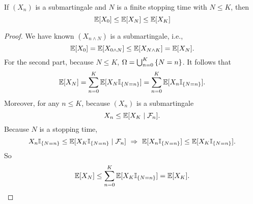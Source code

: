 \begin{lem}
    If $(X_n)$ is a submartingale and $N$ is a finite stopping time with $N \leq K$, then
    \begin{equation*}
        \mathbb{E}[X_0] \leq \mathbb{E}[X_N] \leq \mathbb{E}[X_K]
    \end{equation*}
\end{lem}
\begin{proof}
    We have known $(X_{n \wedge N})$ is a submartingale, i.e.,
    \begin{equation*}
        \mathbb{E}[X_0] = \mathbb{E}[X_{0 \wedge N}] \leq \mathbb{E}[X_{N \wedge K}] = \mathbb{E}[X_N].
    \end{equation*}
    For the second part, because $N \leq K$, $\Omega = \bigcup_{n=0}^K\left\{N = n\right\}$. It follows that
    \begin{equation*}
        \mathbb{E}[X_N] = \sum_{n=0}^K \mathbb{E}[X_N\mathbb{I}_{\left\{N=n\right\}}] = \sum_{n=0}^K \mathbb{E}[X_n\mathbb{I}_{\left\{N=n\right\}}].
    \end{equation*}
    Moreover, for any $n \leq K$, because $(X_n)$ is a submartingale
    \begin{equation*}
        X_n \leq \mathbb{E}[X_K \mid \mathcal{F}_n].
    \end{equation*}
    Because $N$ is a stopping time,
    \begin{equation*}
        X_n\mathbb{I}_{\left\{N=n\right\}} \leq \mathbb{E}[X_K\mathbb{I}_{\left\{N=n\right\}} \mid \mathcal{F}_n]~\Rightarrow~ \mathbb{E}[X_n\mathbb{I}_{\left\{N=n\right\}}] \leq \mathbb{E}[X_K\mathbb{I}_{\left\{N=n\right\}}].
    \end{equation*}
    So
    \begin{equation*}
        \mathbb{E}[X_N] \leq \sum_{n=0}^K \mathbb{E}[X_K\mathbb{I}_{\left\{N=n\right\}}] = \mathbb{E}[X_K].\qedhere
    \end{equation*}
\end{proof}

